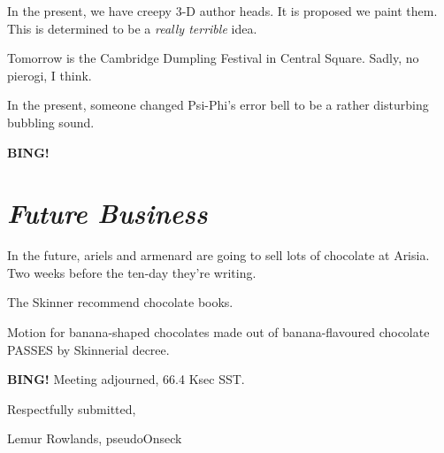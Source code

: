 \documentclass[10pt]{article}
\newcommand{\bing}{{\bf BING!} }
\newcommand{\goto}[1]{\bing \vskip 12pt \section*{{\em{#1}}}}
\newcommand{\onseck}{Lemur Rowlands, pseudoOnseck}
\begin{document}
In the present, we have creepy 3-D author heads.  It is proposed we
paint them.  This is determined to be a \emph{really terrible} idea.

Tomorrow is the Cambridge Dumpling Festival in Central Square.
Sadly, no pierogi, I think.

In the present, someone changed Psi-Phi's error bell to be a rather
disturbing bubbling sound.

\goto{Future Business}

In the future, ariels and armenard are going to sell lots of
chocolate at Arisia.  Two weeks before the ten-day they're writing.

The Skinner recommend chocolate books.

Motion for banana-shaped chocolates made out of banana-flavoured chocolate
PASSES by Skinnerial decree.

\bing
\noindent
Meeting adjourned, 66.4 Ksec SST.

\vspace{18pt}

\centerline{Respectfully submitted,}
\centerline{\onseck}
\end{document}
